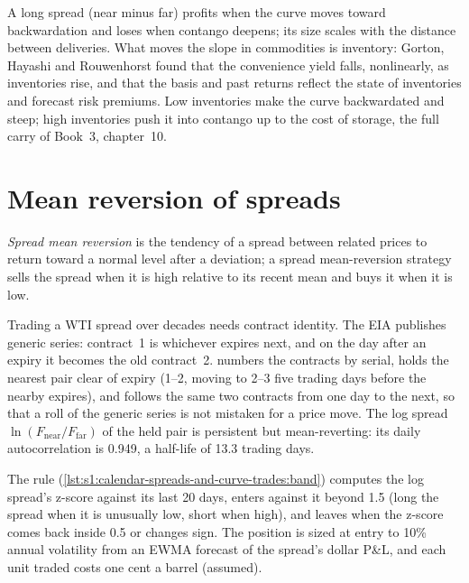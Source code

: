 A long spread (near minus far) profits when the curve moves toward backwardation and loses when contango deepens; its size scales with the distance
between deliveries. What moves the slope in commodities is inventory: Gorton, Hayashi and Rouwenhorst found that the convenience yield falls, nonlinearly,
as inventories rise, and that the basis and past returns reflect the state of inventories and forecast risk premiums. Low inventories make the curve
backwardated and steep; high inventories push it into contango up to the cost of storage, the full carry of Book~3, chapter~10.

\section{Mean reversion of spreads}

\begin{definition}\label{def:s1:calendar-spreads-and-curve-trades:mr}
\emph{Spread mean reversion} is the tendency of a spread between related prices to return toward a normal level after a
deviation; a spread mean-reversion strategy sells the spread when it is high relative to its recent mean and buys it when it is low.
\end{definition}

Trading a WTI spread over decades needs contract identity. The EIA publishes generic series: contract~1 is whichever expires next, and on the day after
an expiry it becomes the old contract~2.  numbers the contracts by serial, holds the nearest pair clear
of expiry (1--2, moving to 2--3 five trading days before the nearby expires), and follows the same two contracts from one day to the next, so that a roll
of the generic series is not mistaken for a price move. The log spread $\ln(F_{\text{near}}/F_{\text{far}})$ of the held pair is persistent but
mean-reverting: its daily autocorrelation is 0.949, a half-life of 13.3 trading days.

The rule (\cref{lst:s1:calendar-spreads-and-curve-trades:band}) computes the log spread's z-score against its last 20 days, enters against it beyond 1.5
(long the spread when it is unusually low, short when high), and leaves when the z-score comes back inside 0.5 or changes sign. The position is sized
at entry to 10\% annual volatility from an EWMA forecast of the spread's dollar P\&L, and each unit traded costs one cent a barrel (assumed).

